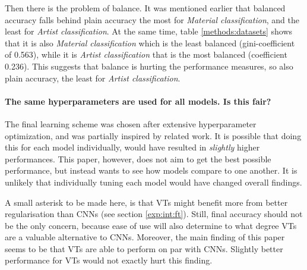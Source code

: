 Then there is the problem of balance. It was mentioned earlier that balanced accuracy falls behind plain accuracy the most for \textit{Material classification}, and the least for \textit{Artist classification}. At the same time, table \ref{methods:datasets} shows that it is also \textit{Material classification} which is the least balanced (gini-coefficient of 0.563), while it is \textit{Artist classification} that is the most balanced (coefficient 0.236). This suggests that balance is hurting the performance measures, so also plain accuracy, the least for \textit{Artist classification}.


\paragraph{The same hyperparameters are used for all models. Is this fair?}
The final learning scheme was chosen after extensive hyperparameter optimization, and was partially inspired by related work. It is possible that doing this for each model individually, would have resulted in \textit{slightly} higher performances. This paper, however, does not aim to get the best possible performance, but instead wants to see how models compare to one another. It is unlikely that individually tuning each model would have changed overall findings.

A small asterisk to be made here, is that VTs might benefit more from better regularisation than CNNs (see section \ref{exp:int:ft}). Still, final accuracy should not be the only concern, because ease of use will also determine to what degree VTs are a valuable alternative to CNNs. Moreover, the main finding of this paper seems to be that VTs are able to perform on par with CNNs. Slightly better performance for VTs would not exactly hurt this finding.

